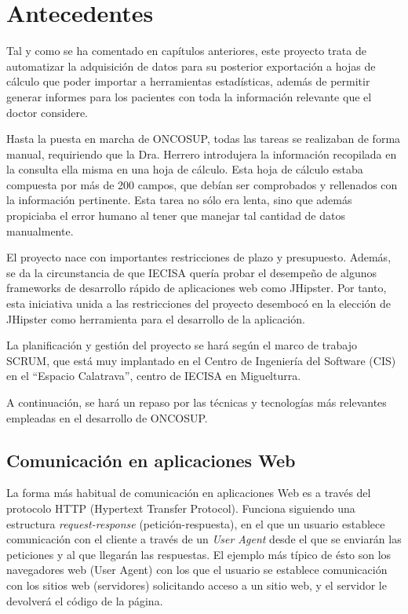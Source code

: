 \chapter{Antecedentes}
\label{chap:antecedentes}

Tal y como se ha comentado en capítulos anteriores, este proyecto trata de automatizar la adquisición de datos para su posterior exportación a hojas de cálculo que poder importar a herramientas estadísticas, además de permitir generar informes para los pacientes con toda la información relevante que el doctor considere.

Hasta la puesta en marcha de ONCOSUP, todas las tareas se realizaban de forma manual, requiriendo que la Dra. Herrero introdujera la información recopilada en la consulta ella misma en una hoja de cálculo. Esta hoja de cálculo estaba compuesta por más de 200 campos, que debían ser comprobados y rellenados con la información pertinente. Esta tarea no sólo era lenta, sino que además propiciaba el error humano al tener que manejar tal cantidad de datos manualmente.

El proyecto nace con importantes restricciones de plazo y presupuesto. Además, se da la circunstancia de que IECISA quería probar el desempeño de algunos frameworks de desarrollo rápido de aplicaciones web como JHipster\cite{jhipster}. Por tanto, esta iniciativa unida a las restricciones del proyecto desembocó en la elección de JHipster como herramienta para el desarrollo de la aplicación.

La planificación y gestión del proyecto se hará según el marco de trabajo SCRUM, que está muy implantado en el Centro de Ingeniería del Software (CIS) en el ``Espacio Calatrava'', centro de IECISA en Miguelturra. 

A continuación, se hará un repaso por las técnicas y tecnologías más relevantes empleadas en el desarrollo de ONCOSUP.
\section{Comunicación en aplicaciones Web}
\label{sec:comunicaciónWeb}

La forma más habitual de comunicación en aplicaciones Web es a través del protocolo HTTP (Hypertext Transfer Protocol). Funciona siguiendo una estructura \emph{request-response} (petición-respuesta), en el que un usuario establece comunicación con el cliente a través de un \emph{User Agent} desde el que se enviarán las peticiones y al que llegarán las respuestas. El ejemplo más típico de ésto son los navegadores web (User Agent) con los que el usuario se establece comunicación con los sitios web (servidores) solicitando acceso a un sitio web, y el servidor le devolverá el código de la página.

